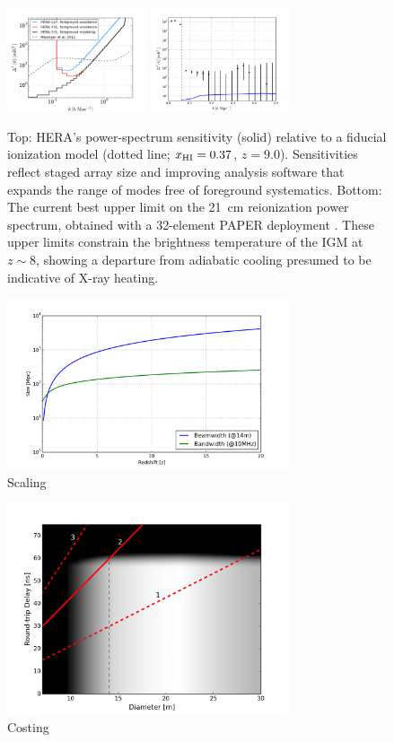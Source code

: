 \documentclass[ars]{copernicus}
\def\HI{{H{\small I }}}
\def\xHI{{x_{\rm\HI}}}
\begin{document}
\begin{figure}[t]
\includegraphics[width=4.1cm]{plots/eor_pspec_2014.png}
\includegraphics[width=4.1cm]{plots/hera_pk3pk.png}
\caption{\small Top: HERA's power-spectrum sensitivity (solid)
relative to a fiducial ionization model (dotted line; $\xHI=0.37$, $z=9.0$).  
Sensitivities reflect staged array size and
improving analysis software that expands the range
of modes free of foreground systematics. 
Bottom: The current best upper limit on the 21~cm reionization power spectrum,
obtained with a 32-element PAPER deployment \citep{parsons_et_al2013}.  These upper limits
constrain the brightness temperature of the IGM at $z\sim8$, showing
a departure from adiabatic cooling presumed to be indicative of X-ray heating.}
\label{fig:eor_pspec}
\end{figure}

\begin{figure}[t]
\includegraphics[width=8.3cm]{plots/heraXY.png}
\caption{\small Scaling}
\label{fig:heraXY}
\end{figure}

\begin{figure}[t]
\includegraphics[width=8.3cm]{plots/costing.png}
\caption{Costing}
\label{fig:costing}
\end{figure}
\end{document}

